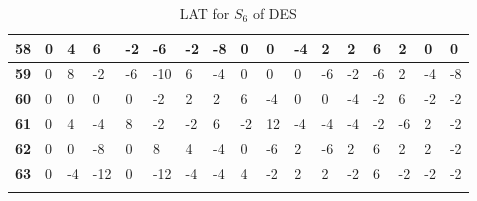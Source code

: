 \begin{longtable}[c]{|l|l|l|l|l|l|l|l|l|l|l|l|l|l|l|l|l|}
\textbf{58} & 0          & 4          & 6          & -2         & -6         & -2         & -8         & 0          & 0          & -4         & 2           & 2           & 6           & 2           & 0           & 0           \\ \hline
\textbf{59} & 0          & 8          & -2         & -6         & -10        & 6          & -4         & 0          & 0          & 0          & -6          & -2          & -6          & 2           & -4          & -8          \\ \hline
\textbf{60} & 0          & 0          & 0          & 0          & -2         & 2          & 2          & 6          & -4         & 0          & 0           & -4          & -2          & 6           & -2          & -2          \\ \hline
\textbf{61} & 0          & 4          & -4         & 8          & -2         & -2         & 6          & -2         & 12         & -4         & -4          & -4          & -2          & -6          & 2           & -2          \\ \hline
\textbf{62} & 0          & 0          & -8         & 0          & 8          & 4          & -4         & 0          & -6         & 2          & -6          & 2           & 6           & 2           & 2           & -2          \\ \hline
\textbf{63} & 0          & -4         & -12        & 0          & -12        & -4         & -4         & 4          & -2         & 2          & 2           & -2          & 6           & -2          & -2          & -2          \\ \hline
\caption{LAT for $S_6$ of DES}
\label{tbl:lat6}
\end{longtable}